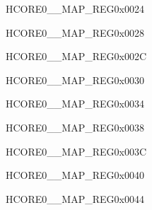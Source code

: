 \begin{register}{H}{CORE0\_\_MAP\_REG}{0x0024}\label{regdesc:CORE0LPADCINTMAPREG}
\end{register}\vspace{-3em}


\begin{register}{H}{CORE0\_\_MAP\_REG}{0x0028}\label{regdesc:CORE0LPGPIOINTMAPREG}
\end{register}\vspace{-3em}


\begin{register}{H}{CORE0\_\_MAP\_REG}{0x002C}\label{regdesc:CORE0LPI2CINTMAPREG}
\end{register}\vspace{-3em}


\begin{register}{H}{CORE0\_\_MAP\_REG}{0x0030}\label{regdesc:CORE0LPI2SINTMAPREG}
\end{register}\vspace{-3em}


\begin{register}{H}{CORE0\_\_MAP\_REG}{0x0034}\label{regdesc:CORE0LPSPIINTMAPREG}
\end{register}\vspace{-3em}


\begin{register}{H}{CORE0\_\_MAP\_REG}{0x0038}\label{regdesc:CORE0LPTOUCHINTMAPREG}
\end{register}\vspace{-3em}


\begin{register}{H}{CORE0\_\_MAP\_REG}{0x003C}\label{regdesc:CORE0LPTSENSINTMAPREG}
\end{register}\vspace{-3em}


\begin{register}{H}{CORE0\_\_MAP\_REG}{0x0040}\label{regdesc:CORE0LPUARTINTMAPREG}
\end{register}\vspace{-3em}


\begin{register}{H}{CORE0\_\_MAP\_REG}{0x0044}\label{regdesc:CORE0LPEFUSEINTMAPREG}
\end{register}\vspace{-3em}



